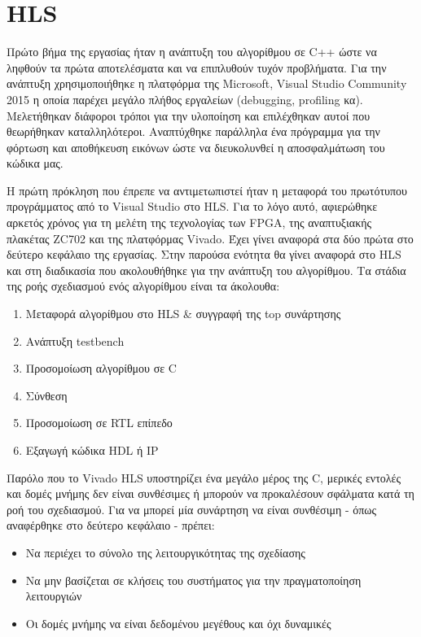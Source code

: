 \section{HLS} \label{HLS}

Πρώτο βήμα της εργασίας ήταν η ανάπτυξη του αλγορίθμου σε C++ ώστε να ληφθούν τα πρώτα αποτελέσματα και να επιπλυθούν τυχόν προβλήματα. Για την ανάπτυξη χρησιμοποιήθηκε η πλατφόρμα της Microsoft, Visual Studio Community 2015 η οποία παρέχει μεγάλο πλήθος εργαλείων (debugging, profiling κα). Μελετήθηκαν διάφοροι τρόποι για την υλοποίηση και επιλέχθηκαν αυτοί που θεωρήθηκαν καταλληλότεροι. Αναπτύχθηκε παράλληλα ένα πρόγραμμα για την φόρτωση και αποθήκευση εικόνων ώστε να διευκολυνθεί η αποσφαλμάτωση του κώδικα μας.

H πρώτη πρόκληση που έπρεπε να αντιμετωπιστεί ήταν η μεταφορά του πρωτότυπου προγράμματος από το Visual Studio στο HLS. Για το λόγο αυτό, αφιερώθηκε αρκετός χρόνος για τη μελέτη της τεχνολογίας των FPGA, της αναπτυξιακής πλακέτας ZC702 και της πλατφόρμας Vivado. Έχει γίνει αναφορά στα δύο πρώτα στο δεύτερο κεφάλαιο της εργασίας. Στην παρούσα ενότητα θα γίνει αναφορά στο HLS και στη διαδικασία που ακολουθήθηκε για την ανάπτυξη του αλγορίθμου. Τα στάδια της ροής σχεδιασμού ενός αλγορίθμου είναι τα άκολουθα:
\begin{enumerate}[leftmargin=*]
	\item{Μεταφορά αλγορίθμου στο HLS \& συγγραφή της top συνάρτησης}
	\item{Ανάπτυξη testbench}
	\item{Προσομοίωση αλγορίθμου σε C}
	\item{Σύνθεση}
	\item{Προσομοίωση σε RTL επίπεδο}
	\item{Εξαγωγή κώδικα HDL ή IP} \\
\end{enumerate}

\newpage Παρόλο που το Vivado HLS υποστηρίζει ένα μεγάλο μέρος της C, μερικές εντολές και δομές μνήμης δεν είναι συνθέσιμες ή μπορούν να προκαλέσουν σφάλματα κατά τη ροή του σχεδιασμού. Για να μπορεί μία συνάρτηση να είναι συνθέσιμη - όπως αναφέρθηκε στο δεύτερο κεφάλαιο - πρέπει:
\begin{itemize}[leftmargin=*]
	\item{Να περιέχει το σύνολο της λειτουργικότητας της σχεδίασης}
	\item{Να μην βασίζεται σε κλήσεις του συστήματος για την πραγματοποίηση λειτουργιών}
	\item{Οι δομές μνήμης να είναι δεδομένου μεγέθους και όχι δυναμικές}
\end{itemize}
